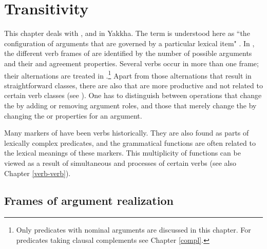 
\chapter{Transitivity}\label{verb-val}

\newcommand{\redesap}[1]{#1} %

This chapter deals with ,  and  in Yakkha. The term  is understood here as “the configuration of arguments that are governed by a particular lexical item" \citep[1130]{Haspelmath2004_Valency}. In , the  different verb frames of  are identified by the number of possible arguments and their  and agreement properties. Several verbs occur in more than one frame; their alternations are treated in .\footnote{Only predicates with nominal arguments are discussed in this chapter. For predicates taking clausal complements see Chapter \ref{compl}.} Apart from those alternations that result in straightforward classes, there are also  that are more productive and not related to certain verb classes (see ). One has to distinguish between operations that change the  by adding or removing argument roles, and those that merely change the  by changing the  or  properties for an argument. 

Many markers of  have been verbs historically. They are also found as parts of lexically complex predicates, and the grammatical functions are often related to the lexical meanings of these markers. This multiplicity of functions can be viewed as a result of simultaneous  and  processes of certain verbs (see also Chapter \ref{verb-verb}). 

\section{Frames of argument realization}\label{frames}

